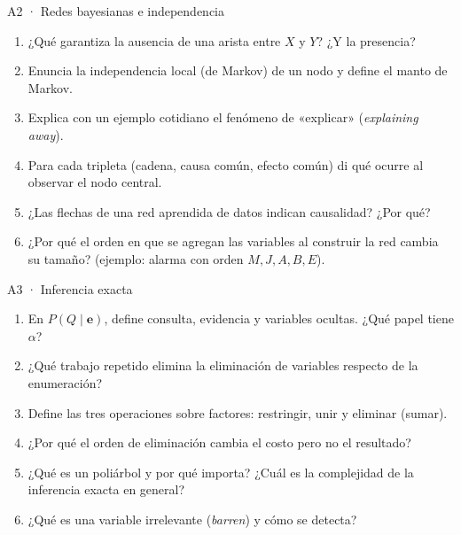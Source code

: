 \begin{ejercicio}{A2 · Redes bayesianas e independencia }
\begin{enumerate}[label=\arabic*.]
\item ¿Qué garantiza la ausencia de una arista entre $X$ y $Y$? ¿Y la presencia?
\item Enuncia la independencia local (de Markov) de un nodo y define el manto de Markov.
\item Explica con un ejemplo cotidiano el fenómeno de «explicar» (\emph{explaining away}).
\item Para cada tripleta (cadena, causa común, efecto común) di qué ocurre al observar el nodo central.
\item ¿Las flechas de una red aprendida de datos indican causalidad? ¿Por qué?
\item ¿Por qué el orden en que se agregan las variables al construir la red cambia su tamaño? (ejemplo: alarma con orden $M,J,A,B,E$).
\end{enumerate}
\end{ejercicio}

\begin{ejercicio}{A3 · Inferencia exacta }
\begin{enumerate}[label=\arabic*.]
\item En $P(Q\mid\mathbf e)$, define consulta, evidencia y variables ocultas. ¿Qué papel tiene $\alpha$?
\item ¿Qué trabajo repetido elimina la eliminación de variables respecto de la enumeración?
\item Define las tres operaciones sobre factores: restringir, unir y eliminar (sumar).
\item ¿Por qué el orden de eliminación cambia el costo pero no el resultado?
\item ¿Qué es un poliárbol y por qué importa? ¿Cuál es la complejidad de la inferencia exacta en general?
\item ¿Qué es una variable irrelevante (\emph{barren}) y cómo se detecta?
\end{enumerate}
\end{ejercicio}

